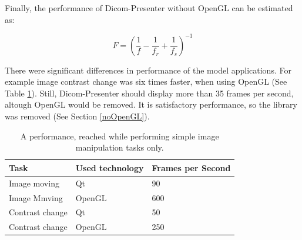 Finally, the performance of Dicom-Presenter without OpenGL can be estimated as:

\begin{equation} \label{estimate}
F = \left(\frac{1}{f} - \frac{1}{f_{r}} + \frac{1}{f_{s}}\right)^{-1}
\end{equation}

There were significant differences in performance of the model applications. For example image contrast change was six times faster, when using OpenGL (See Table \ref{results}). Still, Dicom-Presenter should display more than 35 frames per second, altough OpenGL would be removed. It is satisfactory performance, so the library was removed (See Section \ref{noOpenGL}).

\begin{table}
\begin{center}
\caption{A performance, reached while performing simple image manipulation tasks only.\label{results}}
  \begin{tabular}{| l || l | l | }
	\hline
	Task & Used technology  & Frames per Second \\
    \hline \hline
    Image moving & Qt & 90 \\ \hline
    Image Mmving & OpenGL & 600 \\ \hline
    Contrast change & Qt & 50 \\ \hline
	Contrast change & OpenGL & 250 \\
    \hline
  \end{tabular}
  \end{center}
\end{table}





